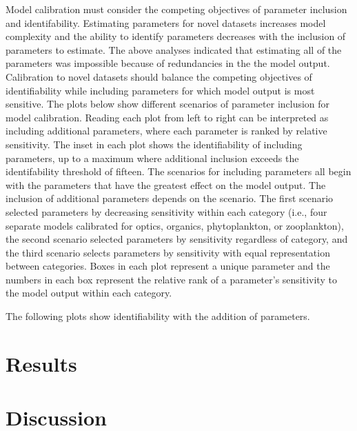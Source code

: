 \documentclass[letterpaper,12pt,oneside]{article}\usepackage[]{graphicx}\usepackage[]{color}
\begin{document}
Model calibration must consider the competing objectives of parameter inclusion and identifability.  Estimating parameters for novel datasets increases model complexity and the ability to identify parameters decreases with the inclusion of parameters to estimate.  The above analyses indicated that estimating all of the parameters was impossible because of redundancies in the the model output.  Calibration to novel datasets should balance the competing objectives of identifiability while including parameters for which model output is most sensitive.  The plots below show different scenarios of parameter inclusion for model calibration.  Reading each plot from left to right can be interpreted as including additional parameters, where each parameter is ranked by relative sensitivity.  The inset in each plot shows the identifiability of including parameters, up to a maximum where additional inclusion exceeds the identifability threshold of fifteen.  The scenarios for including parameters all begin with the parameters that have the greatest effect on the model output.  The inclusion of additional parameters depends on the scenario.  The first scenario selected parameters by decreasing sensitivity within each category (i.e., four separate models calibrated for optics, organics, phytoplankton, or zooplankton), the second scenario selected parameters by sensitivity regardless of category, and the third scenario selects parameters by sensitivity with equal representation between categories.  Boxes in each plot represent a unique parameter and the numbers in each box represent the relative rank of a parameter's sensitivity to the model output within each category. 

The following plots show identifiability with the addition of parameters. 


\section{Results}

\section{Discussion}
\end{document}
